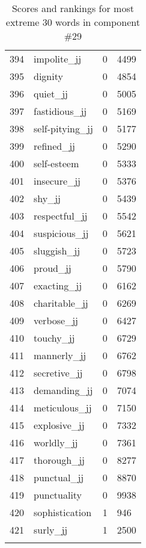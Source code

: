 \begin{longtable}[!htbp]{| rlr@{.}l |}
    394 & impolite\_jj & 0 & 4499 \\
    395 & dignity & 0 & 4854 \\
    396 & quiet\_jj & 0 & 5005 \\
    397 & fastidious\_jj & 0 & 5169 \\
    398 & self-pitying\_jj & 0 & 5177 \\
    399 & refined\_jj & 0 & 5290 \\
    400 & self-esteem & 0 & 5333 \\
    401 & insecure\_jj & 0 & 5376 \\
    402 & shy\_jj & 0 & 5439 \\
    403 & respectful\_jj & 0 & 5542 \\
    404 & suspicious\_jj & 0 & 5621 \\
    405 & sluggish\_jj & 0 & 5723 \\
    406 & proud\_jj & 0 & 5790 \\
    407 & exacting\_jj & 0 & 6162 \\
    408 & charitable\_jj & 0 & 6269 \\
    409 & verbose\_jj & 0 & 6427 \\
    410 & touchy\_jj & 0 & 6729 \\
    411 & mannerly\_jj & 0 & 6762 \\
    412 & secretive\_jj & 0 & 6798 \\
    413 & demanding\_jj & 0 & 7074 \\
    414 & meticulous\_jj & 0 & 7150 \\
    415 & explosive\_jj & 0 & 7332 \\
    416 & worldly\_jj & 0 & 7361 \\
    417 & thorough\_jj & 0 & 8277 \\
    418 & punctual\_jj & 0 & 8870 \\
    419 & punctuality & 0 & 9938 \\
    420 & sophistication & 1 & 946 \\
    421 & surly\_jj & 1 & 2500 \\
    \hline
    \caption{Scores and rankings for most extreme 30 words in component \#29} \\
\end{longtable}
